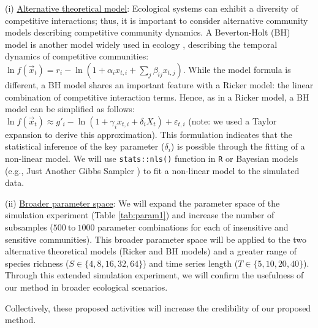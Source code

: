 \documentclass[12pt, class=article, crop=false]{standalone}
\begin{document}
(i) \ul{Alternative theoretical model}:
Ecological systems can exhibit a diversity of competitive interactions; thus, it is important to consider alternative community models describing competitive community dynamics. 
A Beverton-Holt (BH) model is another model widely used in ecology \citep{otto_biologists_2011}, describing the temporal dynamics of competitive communities: $\ln f(\overset{\rightarrow}{x}_{t}) = r_i - \ln(1 + \alpha_i x_{t,i} + \sum_j \beta_{ij} x_{t,j})$. 
While the model formula is different, a BH model shares an important feature with a Ricker model: the linear combination of competitive interaction terms.
Hence, as in a Ricker model, a BH model can be simplified as follows: $\ln f(\overset{\rightarrow}{x}_{t}) \approx g'_{i} - \ln(1 + \gamma_i x_{t,i} + \delta_i X_t) + \varepsilon_{t,i}$ (note: we used a Taylor expansion to derive this approximation).
This formulation indicates that the statistical inference of the key parameter ($\delta_i$) is possible through the fitting of a non-linear model.
We will use \texttt{stats::nls()} function in \texttt{R} or Bayesian models (e.g., Just Another Gibbs Sampler \citep{plummer_jags_2003}) to fit a non-linear model to the simulated data.

(ii) \ul{Broader parameter space}: We will expand the parameter space of the simulation experiment (Table \ref{tab:param1}) and increase the number of subsamples ($500~\mbox{to}~1000$ parameter combinations for each of insensitive and sensitive communities).
This broader parameter space will be applied to the two alternative theoretical models (Ricker and BH models) and a greater range of species richness ($S \in \{4, 8, 16, 32, 64\}$) and time series length ($T \in \{5, 10, 20, 40\}$).
Through this extended simulation experiment, we will confirm the usefulness of our method in broader ecological scenarios.

Collectively, these proposed activities will increase the credibility of our proposed method.
\end{document}

